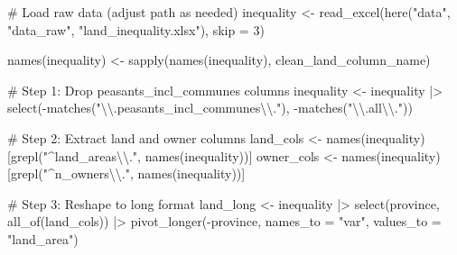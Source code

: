 \documentclass[
  9pt,
  letterpaper,
  DIV=11,
  numbers=noendperiod]{scrartcl}
\newenvironment{Shaded}{\begin{snugshade}}{\end{snugshade}}
\newcommand{\AttributeTok}[1]{\textcolor[rgb]{0.16,0.50,0.73}{#1}}
\newcommand{\CommentTok}[1]{\textcolor[rgb]{0.48,0.49,0.49}{#1}}
\newcommand{\DecValTok}[1]{\textcolor[rgb]{0.96,0.45,0.00}{#1}}
\newcommand{\FunctionTok}[1]{\textcolor[rgb]{0.56,0.27,0.68}{#1}}
\newcommand{\NormalTok}[1]{\textcolor[rgb]{0.81,0.81,0.76}{#1}}
\newcommand{\OtherTok}[1]{\textcolor[rgb]{0.15,0.68,0.38}{#1}}
\newcommand{\SpecialCharTok}[1]{\textcolor[rgb]{0.24,0.68,0.91}{#1}}
\newcommand{\StringTok}[1]{\textcolor[rgb]{0.96,0.31,0.31}{#1}}
\begin{document}
\begin{Shaded}
\begin{Highlighting}[]
\CommentTok{\# Load raw data (adjust path as needed)}
\NormalTok{inequality }\OtherTok{\textless{}{-}} \FunctionTok{read\_excel}\NormalTok{(}\FunctionTok{here}\NormalTok{(}\StringTok{"data"}\NormalTok{, }\StringTok{"data\_raw"}\NormalTok{, }\StringTok{"land\_inequality.xlsx"}\NormalTok{), }
                         \AttributeTok{skip =} \DecValTok{3}\NormalTok{)}

\FunctionTok{names}\NormalTok{(inequality) }\OtherTok{\textless{}{-}} \FunctionTok{sapply}\NormalTok{(}\FunctionTok{names}\NormalTok{(inequality), clean\_land\_column\_name)}

\CommentTok{\# Step 1: Drop peasants\_incl\_communes columns}
\NormalTok{inequality }\OtherTok{\textless{}{-}}\NormalTok{ inequality }\SpecialCharTok{|\textgreater{}}
  \FunctionTok{select}\NormalTok{(}\SpecialCharTok{{-}}\FunctionTok{matches}\NormalTok{(}\StringTok{"}\SpecialCharTok{\textbackslash{}\textbackslash{}}\StringTok{.peasants\_incl\_communes}\SpecialCharTok{\textbackslash{}\textbackslash{}}\StringTok{."}\NormalTok{),}
         \SpecialCharTok{{-}}\FunctionTok{matches}\NormalTok{(}\StringTok{"}\SpecialCharTok{\textbackslash{}\textbackslash{}}\StringTok{.all}\SpecialCharTok{\textbackslash{}\textbackslash{}}\StringTok{."}\NormalTok{))}

\CommentTok{\# Step 2: Extract land and owner columns}
\NormalTok{land\_cols }\OtherTok{\textless{}{-}} \FunctionTok{names}\NormalTok{(inequality)[}\FunctionTok{grepl}\NormalTok{(}\StringTok{"\^{}land\_areas}\SpecialCharTok{\textbackslash{}\textbackslash{}}\StringTok{."}\NormalTok{, }\FunctionTok{names}\NormalTok{(inequality))]}
\NormalTok{owner\_cols }\OtherTok{\textless{}{-}} \FunctionTok{names}\NormalTok{(inequality)[}\FunctionTok{grepl}\NormalTok{(}\StringTok{"\^{}n\_owners}\SpecialCharTok{\textbackslash{}\textbackslash{}}\StringTok{."}\NormalTok{, }\FunctionTok{names}\NormalTok{(inequality))]}

\CommentTok{\# Step 3: Reshape to long format}
\NormalTok{land\_long }\OtherTok{\textless{}{-}}\NormalTok{ inequality }\SpecialCharTok{|\textgreater{}}
  \FunctionTok{select}\NormalTok{(province, }\FunctionTok{all\_of}\NormalTok{(land\_cols)) }\SpecialCharTok{|\textgreater{}}
  \FunctionTok{pivot\_longer}\NormalTok{(}\SpecialCharTok{{-}}\NormalTok{province, }\AttributeTok{names\_to =} \StringTok{"var"}\NormalTok{, }\AttributeTok{values\_to =} \StringTok{"land\_area"}\NormalTok{)}


\end{Highlighting}
\end{Shaded}
\end{document}
